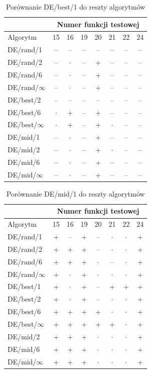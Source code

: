 \documentclass[a4paper,onecolumn,oneside,12pt,wide,floatssmall]{mwrep}
\theoremstyle{definition}
\theoremstyle{plain}%
\theoremstyle{remark}
\begin{document}
\begin{table}[H]
\centering
\begin{tabular}{ l | c | c | c | c | c | c | c }
		 & \multicolumn{7}{c}{Numer funkcji testowej}  \\  \hline
Algorytm         &15& 16& 19& 20& 21& 22& 24 \\ \hline
DE/rand/1	 & -- & -- & -- & -- & -- & -- & -- \\
DE/rand/2	 & -- & $\cdot$ & -- & + & -- & -- & -- \\
DE/rand/6	 & -- & $\cdot$ & -- & + & -- & -- & -- \\
DE/rand/$\infty$	 & -- & $\cdot$ & -- & + & -- & -- & -- \\
DE/best/2	 & -- & -- & -- & -- & -- & -- & -- \\
DE/best/6	 & $\cdot$ & + & -- & + & -- & -- & -- \\
DE/best/$\infty$	 & $\cdot$ & + & -- & + & $\cdot$ & -- & -- \\
DE/mid/1	 & -- & $\cdot$ & -- & + & -- & -- & -- \\
DE/mid/2	 & -- & $\cdot$ & -- & + & $\cdot$ & -- & -- \\
DE/mid/6	 & -- & $\cdot$ & -- & + & -- & -- & -- \\
DE/mid/$\infty$	 & -- & $\cdot$ & -- & + & -- & -- & -- \\
\end{tabular}
\caption{Porównanie DE/best/1 do reszty algorytmów}
\end{table}

\begin{table}[H]
\centering
\begin{tabular}{ l | c | c | c | c | c | c | c }
		 & \multicolumn{7}{c}{Numer funkcji testowej}  \\  \hline
Algorytm         &15& 16& 19& 20& 21& 22& 24 \\ \hline
DE/rand/1	 & + & -- & + & -- & $\cdot$ & $\cdot$ & + \\
DE/rand/2	 & + & + & + & -- & $\cdot$ & $\cdot$ & + \\
DE/rand/6	 & + & + & + & $\cdot$ & -- & $\cdot$ & + \\
DE/rand/$\infty$	 & + & $\cdot$ & + & $\cdot$ & $\cdot$ & $\cdot$ & + \\
DE/best/1	 & + & $\cdot$ & + & -- & + & + & + \\
DE/best/2	 & + & $\cdot$ & + & -- & $\cdot$ & $\cdot$ & + \\
DE/best/6	 & + & + & + & + & $\cdot$ & $\cdot$ & + \\
DE/best/$\infty$	 & + & + & + & + & + & $\cdot$ & + \\
DE/mid/2	 & + & + & + & $\cdot$ & $\cdot$ & $\cdot$ & + \\
DE/mid/6	 & + & + & + & $\cdot$ & $\cdot$ & $\cdot$ & + \\
DE/mid/$\infty$	 & + & + & + & $\cdot$ & $\cdot$ & $\cdot$ & + \\
\end{tabular}
\caption{Porównanie DE/mid/1 do reszty algorytmów}
\end{table}
\end{document}
